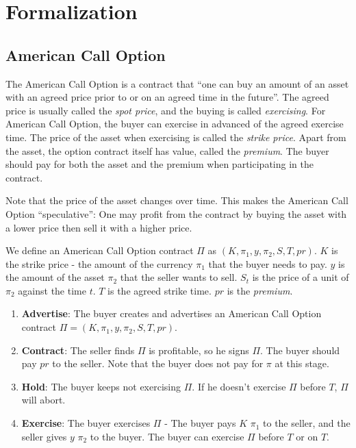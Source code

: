 \section{Formalization}
\label{sec:formalization}

\subsection{American Call Option}

The American Call Option is a contract that ``one can buy an amount of an asset with an agreed price prior to or on an agreed time in the future''.
The agreed price is usually called the \textit{spot price}, and the buying is called \textit{exercising}.
For American Call Option, the buyer can exercise in advanced of the agreed exercise time.
The price of the asset when exercising is called the \textit{strike price}.
Apart from the asset, the option contract itself has value, called the \textit{premium}.
The buyer should pay for both the asset and the premium when participating in the contract.

Note that the price of the asset changes over time. This makes the American Call Option ``speculative'': One may profit from the contract by buying the asset with a lower price then sell it with a higher price.

We define an American Call Option contract $\Pi$ as $(K, \pi_1, y, \pi_2, S, T, pr)$.
$K$ is the strike price - the amount of the currency $\pi_1$ that the buyer needs to pay.
$y$ is the amount of the asset $\pi_2$ that the seller wants to sell.
$S_t$ is the price of a unit of $\pi_2$ against the time $t$.
$T$ is the agreed strike time.
$pr$ is the \textit{premium}.

\begin{enumerate}
    \item \textbf{Advertise}: The buyer creates and advertises an American Call Option contract $\Pi = (K, \pi_1, y, \pi_2, S, T, pr)$.
    \item \textbf{Contract}: The seller finds $\Pi$ is profitable, so he signs $\Pi$.
    The buyer should pay $pr$ to the seller.
    Note that the buyer does not pay for $\pi$ at this stage. 
    \item \textbf{Hold}: The buyer keeps not exercising $\Pi$. If he doesn't exercise $\Pi$ before $T$, $\Pi$ will abort.
    \item \textbf{Exercise}: The buyer exercises $\Pi$ - The buyer pays $K$ $\pi_1$ to the seller, and the seller gives $y$ $\pi_2$ to the buyer. The buyer can exercise $\Pi$ before $T$ or on $T$.
\end{enumerate}

